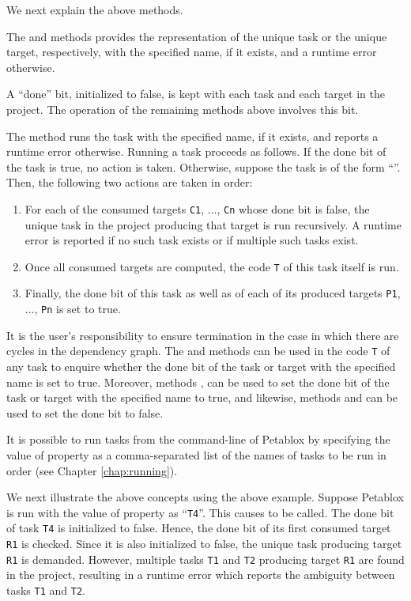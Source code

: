We next explain the above methods.

The  and  methods provides the representation
of the unique task or the unique target, respectively, with the specified name, if it exists,
and a runtime error otherwise.

A ``done'' bit, initialized to false, is kept with each task and each target in
the project.  The operation of the remaining methods above involves this bit.

The  method runs the task with the specified name, if it exists,
and reports a runtime error otherwise.  Running a task proceeds as follows.
If the done bit of the task is true, no action is taken.  Otherwise, 
suppose the task is of the form ``''.  Then,
the following two actions are taken in order:

\begin{enumerate}
\item
For each of the consumed targets {\tt C1}, ..., {\tt Cn} 
whose done bit is false, the unique task in the project producing that target 
is run recursively.
A runtime error is reported if no such task exists or if multiple such tasks exist.
\item
Once all consumed targets are computed, the code {\tt T} of this task itself is run.
\item
Finally, the done bit of this task as well as of each of its produced targets
{\tt P1}, ..., {\tt Pn} is set to true.
\end{enumerate}

It is the user's responsibility to ensure termination in the case in which there are
cycles in the dependency graph.  The  and 
methods can be used in the code {\tt T} of any task to enquire
whether the done bit of the task or target with the specified name is set to true.
Moreover, methods ,  can be used to set
the done bit of the task or target with the specified name to true, and likewise,
methods  and  can be used
to set the done bit to false.

It is possible to run tasks from the command-line of Petablox by specifying the value of property
 as a comma-separated list of the names of tasks to be run in order
(see Chapter \ref{chap:running}).

We next illustrate the above concepts using the above example.
Suppose Petablox is run with the value of property  as ``{\tt T4}''.
This causes  to be called.  The done bit of task {\tt T4} is initialized to false.
Hence, the done bit of its first consumed target {\tt R1} is checked.
Since it is also initialized to false, the unique task producing
target {\tt R1} is demanded.  However, multiple tasks {\tt T1} and {\tt T2} 
producing target {\tt R1} are found in the project, resulting in a runtime error which
reports the ambiguity between tasks {\tt T1} and {\tt T2}.

